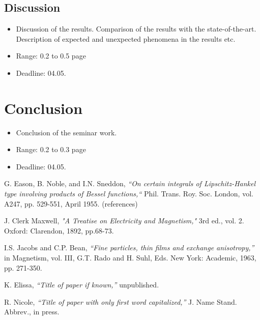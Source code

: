 \documentclass[onecolumn, conference]{IEEEtran}
\newcommand{\fourthDeadline}{Deadline: 04.05.\,\the\year}
\newcommand{\range}[2][0]{Range: #1 to #2 page}
\newcommand{\conciseItem}{\itemsep1pt \parskip0pt \parsep0pt}
\begin{document}
\subsection{Discussion}
\begin{itemize}
	\conciseItem
	\item Discussion of the results. Comparison of the results with the state-of-the-art. Description of expected and unexpected phenomena in the results etc.
	\item \range[0.2]{0.5}
	\item \fourthDeadline
\end{itemize}

\section{Conclusion}
\begin{itemize}
	\conciseItem
	\item Conclusion of the seminar work.
	\item \range[0.2]{0.3}
	\item \fourthDeadline
\end{itemize}




%
%
%
\begin{thebibliography}{1}

G. Eason, B. Noble, and I.N. Sneddon, \emph{“On certain integrals of Lipschitz-Hankel type involving products of Bessel functions,“} Phil. Trans. Roy. Soc. London, vol. A247, pp. 529-551, April 1955. (references)

J. Clerk Maxwell, \emph{"A Treatise on Electricity and Magnetism,"} 3rd ed., vol. 2. Oxford: Clarendon, 1892, pp.68-73.

I.S. Jacobs and C.P. Bean, \emph{“Fine particles, thin films and exchange anisotropy,”} in Magnetism, vol. III, G.T. Rado and H. Suhl, Eds. New York: Academic, 1963, pp. 271-350.

K. Elissa, \emph{“Title of paper if known,”} unpublished.

R. Nicole, \emph{“Title of paper with only first word capitalized,”} J. Name Stand. Abbrev., in press.

\end{thebibliography}
\end{document}
